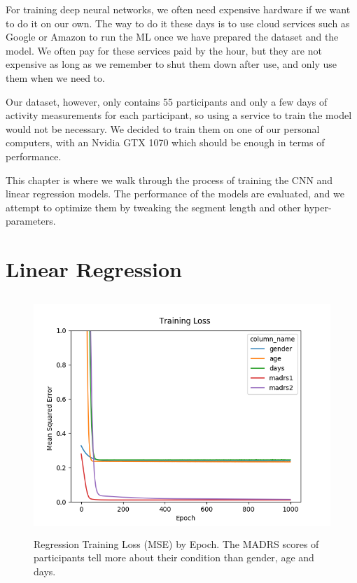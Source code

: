 For training deep neural networks, we often need expensive hardware if we want to do it on our own. The way to do it these days is to use cloud services such as Google or Amazon to run the ML once we have prepared the dataset and the model. We often pay for these services paid by the hour, but they are not expensive as long as we remember to shut them down after use, and only use them when we need to.

Our dataset, however, only contains 55 participants and only a few days of activity measurements for each participant, so using a service to train the model would not be necessary. We decided to train them on one of our personal computers, with an Nvidia GTX 1070 which should be enough in terms of performance.

This chapter is where we walk through the process of training the CNN and linear regression models. The performance of the models are evaluated, and we attempt to optimize them by tweaking the segment length and other hyper-parameters.
 
\section{Linear Regression}

\begin{figure}
\begin{center}
      \includegraphics[height=9cm]{img/regression/results_kerasregressor_1k_epochs.png}
      \caption{Regression Training Loss (MSE) by Epoch. The MADRS scores of participants tell more about their condition than gender, age and days.}
      \label{figure:regression_training_loss}
\end{center}
\end{figure}

